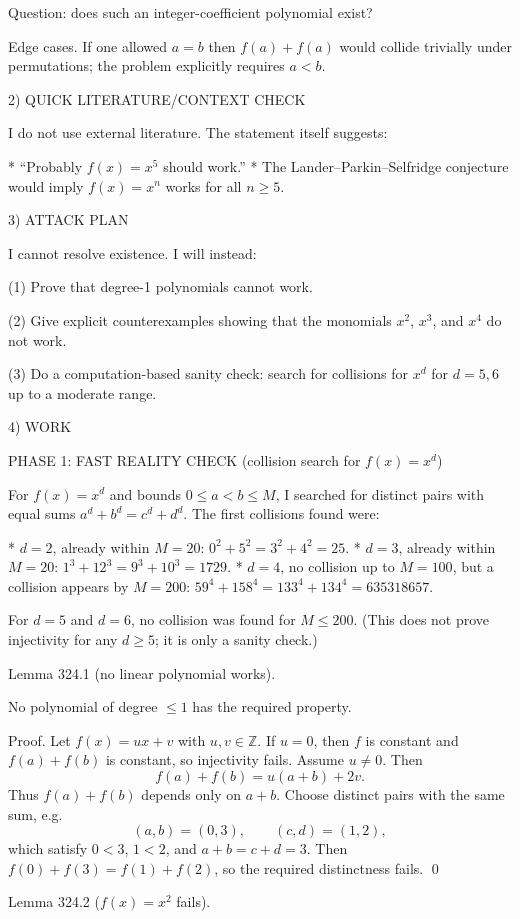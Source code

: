 Question: does such an integer-coefficient polynomial exist?

Edge cases.
If one allowed $a=b$ then $f(a)+f(a)$ would collide trivially under permutations; the problem explicitly requires $a<b$.


2) QUICK LITERATURE/CONTEXT CHECK

I do not use external literature.
The statement itself suggests:

* ``Probably $f(x)=x^5$ should work.''
* The Lander--Parkin--Selfridge conjecture would imply $f(x)=x^n$ works for all $n\ge 5$.


3) ATTACK PLAN

I cannot resolve existence. I will instead:

(1) Prove that degree-1 polynomials cannot work.

(2) Give explicit counterexamples showing that the monomials $x^2$, $x^3$, and $x^4$ do not work.

(3) Do a computation-based sanity check: search for collisions for $x^d$ for $d=5,6$ up to a moderate range.


4) WORK

PHASE 1: FAST REALITY CHECK (collision search for $f(x)=x^d$)

For $f(x)=x^d$ and bounds $0\le a<b\le M$, I searched for distinct pairs with equal sums $a^d+b^d=c^d+d^d$.
The first collisions found were:

* $d=2$, already within $M=20$: $0^2+5^2=3^2+4^2=25$.
* $d=3$, already within $M=20$: $1^3+12^3=9^3+10^3=1729$.
* $d=4$, no collision up to $M=100$, but a collision appears by $M=200$:
  $59^4+158^4=133^4+134^4=635318657$.

For $d=5$ and $d=6$, no collision was found for $M\le 200$.
(This does not prove injectivity for any $d\ge 5$; it is only a sanity check.)


Lemma 324.1 (no linear polynomial works).

No polynomial of degree $\le 1$ has the required property.

Proof.
Let $f(x)=ux+v$ with $u,v\in\mathbb Z$.
If $u=0$, then $f$ is constant and $f(a)+f(b)$ is constant, so injectivity fails.
Assume $u\neq 0$.
Then
\[
f(a)+f(b)=u(a+b)+2v.
\]
Thus $f(a)+f(b)$ depends only on $a+b$.
Choose distinct pairs with the same sum, e.g.
\[
(a,b)=(0,3),\qquad (c,d)=(1,2),
\]
which satisfy $0<3$, $1<2$, and $a+b=c+d=3$.
Then $f(0)+f(3)=f(1)+f(2)$, so the required distinctness fails.
\qed


Lemma 324.2 ($f(x)=x^2$ fails).

